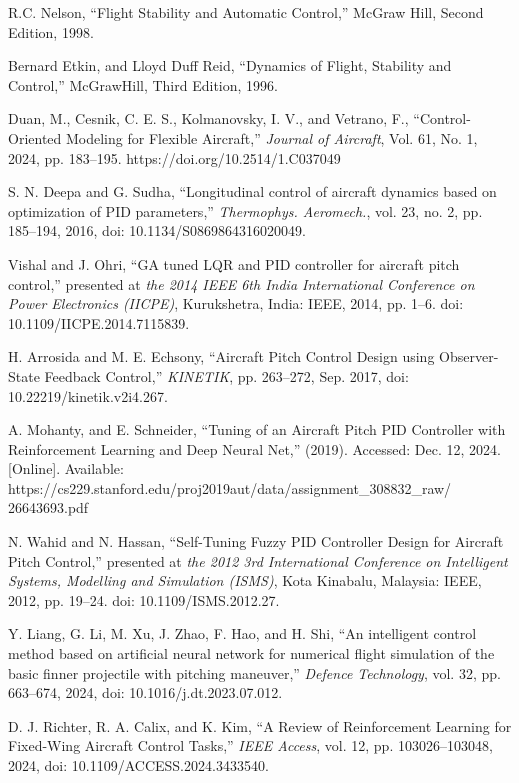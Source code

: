 \documentclass[lettersize,journal]{IEEEtran}
\begin{document}
\begin{thebibliography}{1}


R.C. Nelson, ``Flight Stability and Automatic Control,'' McGraw Hill, Second Edition, 1998.

Bernard Etkin, and Lloyd Duff Reid, ``Dynamics of Flight, Stability and Control,'' McGrawHill, Third Edition, 1996.

Duan, M., Cesnik, C. E. S., Kolmanovsky, I. V., and Vetrano, F., ``Control-Oriented Modeling for Flexible Aircraft,'' \textit{Journal of Aircraft}, Vol. 61, No. 1, 2024, pp. 183–195. https://doi.org/10.2514/1.C037049

S. N. Deepa and G. Sudha, ``Longitudinal control of aircraft dynamics based on optimization of PID parameters,'' \textit{Thermophys. Aeromech.}, vol. 23, no. 2, pp. 185–194, 2016, doi: 10.1134/S0869864316020049.

Vishal and J. Ohri, ``GA tuned LQR and PID controller for aircraft pitch control,'' presented at \textit{the 2014 IEEE 6th India International Conference on Power Electronics (IICPE)}, Kurukshetra, India: IEEE, 2014, pp. 1–6. doi: 10.1109/IICPE.2014.7115839.

H. Arrosida and M. E. Echsony, ``Aircraft Pitch Control Design using Observer-State Feedback Control,'' \textit{KINETIK}, pp. 263–272, Sep. 2017, doi: 10.22219/kinetik.v2i4.267.

A. Mohanty, and E. Schneider, ``Tuning of an Aircraft Pitch PID Controller with Reinforcement Learning and Deep Neural Net,'' (2019). Accessed: Dec. 12, 2024. [Online]. Available: https://cs229.stanford.edu/proj2019aut/data/assignment\_308832\_raw/
26643693.pdf

N. Wahid and N. Hassan, ``Self-Tuning Fuzzy PID Controller Design for Aircraft Pitch Control,'' presented at \textit{the 2012 3rd International Conference on Intelligent Systems, Modelling and Simulation (ISMS)}, Kota Kinabalu, Malaysia: IEEE, 2012, pp. 19–24. doi: 10.1109/ISMS.2012.27.

Y. Liang, G. Li, M. Xu, J. Zhao, F. Hao, and H. Shi, ``An intelligent control method based on artificial neural network for numerical flight simulation of the basic finner projectile with pitching maneuver,'' \textit{Defence Technology}, vol. 32, pp. 663–674, 2024, doi: 10.1016/j.dt.2023.07.012.

D. J. Richter, R. A. Calix, and K. Kim, ``A Review of Reinforcement Learning for Fixed-Wing Aircraft Control Tasks,'' \textit{IEEE Access}, vol. 12, pp. 103026–103048, 2024, doi: 10.1109/ACCESS.2024.3433540.


\end{thebibliography}
\end{document}
